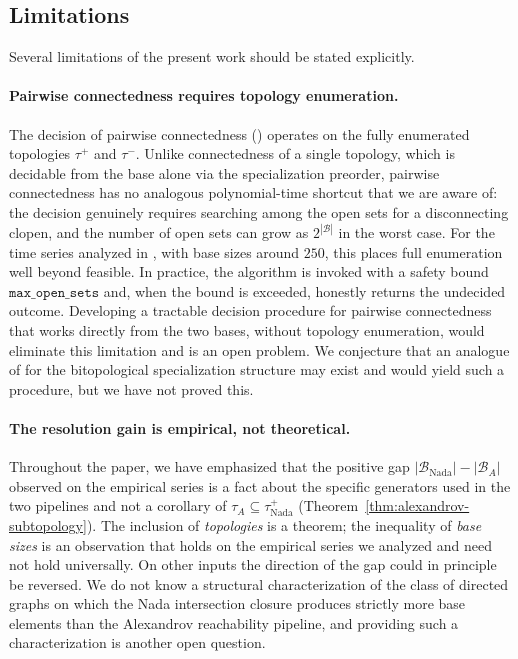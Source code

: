 \documentclass[11pt,a4paper]{article}
\theoremstyle{plain}
\theoremstyle{definition}
\newcommand{\taufwd}{\tau^{+}}
\newcommand{\taubwd}{\tau^{-}}
\newcommand{\base}{\mathcal{B}}
\begin{document}
\subsection{Limitations}\label{subsec:limitations}

Several limitations of the present work should be stated explicitly.

\paragraph{Pairwise connectedness requires topology enumeration.}
The decision of pairwise connectedness
() operates on the fully enumerated
topologies $\taufwd$ and $\taubwd$. Unlike connectedness of a single
topology, which is decidable from the base alone via the specialization
preorder, pairwise connectedness has no analogous polynomial-time
shortcut that we are aware of: the decision genuinely requires
searching among the open sets for a disconnecting clopen, and the
number of open sets can grow as $2^{|\base|}$ in the worst case. For
the time series analyzed in , with base sizes
around $250$, this places full enumeration well beyond feasible. In
practice, the algorithm is invoked with a safety bound
$\texttt{max\_open\_sets}$ and, when the bound is exceeded, honestly
returns the undecided outcome. Developing a tractable decision
procedure for pairwise connectedness that works directly from the two
bases, without topology enumeration, would eliminate this limitation
and is an open problem. We conjecture that an analogue of
 for the bitopological specialization
structure may exist and would yield such a procedure, but we have not
proved this.

\paragraph{The resolution gain is empirical, not theoretical.}
Throughout the paper, we have emphasized that the positive gap
$|\base_{\text{Nada}}| - |\base_{A}|$ observed on the empirical series
is a fact about the specific generators used in the two pipelines and
not a corollary of $\tau_A \subseteq \tau^{+}_{\text{Nada}}$
(Theorem~\ref{thm:alexandrov-subtopology}). The inclusion of
\emph{topologies} is a theorem; the inequality of \emph{base sizes} is
an observation that holds on the empirical series we analyzed and need
not hold universally. On other inputs the direction of the gap could in
principle be reversed. We do not know a structural characterization of
the class of directed graphs on which the Nada intersection closure
produces strictly more base elements than the Alexandrov reachability
pipeline, and providing such a characterization is another open
question.
\end{document}
